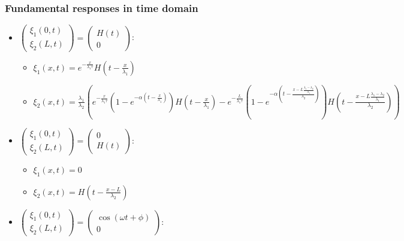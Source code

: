 \documentclass[preprint]{elsarticle}
\begin{document}
\subsubsection{Fundamental responses in time domain}
\begin{itemize}
\item $\left(\begin{array}{c}
\xi_{1}\left(0,t\right)\\
\xi_{2}\left(L,t\right)
\end{array}\right)=\left(\begin{array}{c}
H\left(t\right)\\
0
\end{array}\right)$:

\begin{itemize}
\item $\xi_{1}\left(x,t\right)=e^{-\frac{x}{\lambda_{1}\tau}}H\left(t-\frac{x}{\lambda_{1}}\right)$
\item $\xi_{2}\left(x,t\right)=\frac{\lambda_{1}}{\lambda_{2}}\left(e^{-\frac{x}{\lambda_{1}\tau}}\left(1-e^{-\alpha\left(t-\frac{x}{\lambda_{1}}\right)}\right)H\left(t-\frac{x}{\lambda_{1}}\right)-e^{-\frac{L}{\lambda_{1}\tau}}\left(1-e^{-\alpha\left(t-\frac{x-L\frac{\lambda_{1}-\lambda_{2}}{\lambda_{1}}}{\lambda_{2}}\right)}\right)H\left(t-\frac{x-L\frac{\lambda_{1}-\lambda_{2}}{\lambda_{1}}}{\lambda_{2}}\right)\right)$
\end{itemize}
\item $\left(\begin{array}{c}
\xi_{1}\left(0,t\right)\\
\xi_{2}\left(L,t\right)
\end{array}\right)=\left(\begin{array}{c}
0\\
H\left(t\right)
\end{array}\right)$:

\begin{itemize}
\item $\xi_{1}\left(x,t\right)=0$
\item $\xi_{2}\left(x,t\right)=H\left(t-\frac{x-L}{\lambda_{2}}\right)$
\end{itemize}
\item $\left(\begin{array}{c}
\xi_{1}\left(0,t\right)\\
\xi_{2}\left(L,t\right)
\end{array}\right)=\left(\begin{array}{c}
\cos\left(\omega t+\phi\right)\\
0
\end{array}\right)$:


\end{itemize}
\end{document}
